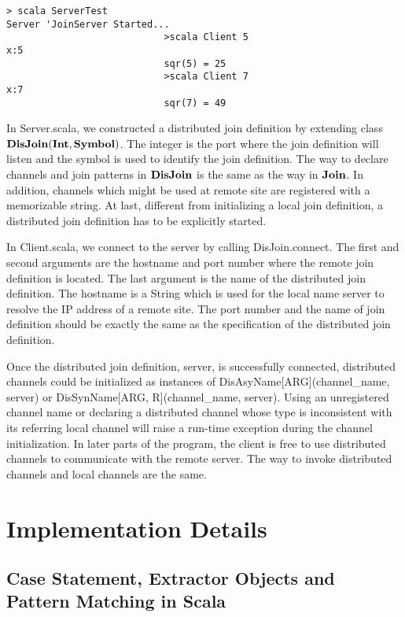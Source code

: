 \begin{lstlisting}
> scala ServerTest                                    
Server 'JoinServer Started...
							>scala Client 5
x:5
							sqr(5) = 25
							>scala Client 7
x:7
							sqr(7) = 49
\end{lstlisting}


In Server.scala, we constructed a distributed join definition by extending class \\ $\bf{DisJoin(Int, Symbol)}$.  The integer is the port where the join definition will listen and the symbol is used to identify the join definition.  The way to declare channels and join patterns in $\bf{DisJoin}$ is the same as the way in $\bf{Join}$.  In addition,  channels which might be used at remote site are registered with a memorizable string.  At last, different from initializing a local join definition, a distributed join definition has to be explicitly started.

In Client.scala, we connect to the server by calling DisJoin.connect.  The first and second arguments are the hostname and port number where the remote join definition is located.  The last argument is the name of the distributed join definition.  The hostname is a String which is used for the local name server to resolve the IP address of a remote site.  The port number and the name of join definition should be exactly the same as the specification of the distributed join definition.

Once the distributed join definition, server, is successfully connected, distributed channels could be initialized as instances of DisAsyName[ARG](channel\_name, server) or DisSynName[ARG, R](channel\_name, server).  Using an unregistered channel name or declaring a distributed channel whose type is inconsistent with  its referring local channel will raise a run-time exception during the channel initialization.  In later parts of the program, the client is free to use distributed channels to communicate with the remote server.  The way to invoke distributed channels and local channels are the same.

\section{Implementation Details}
\subsection{Case Statement, Extractor Objects and Pattern Matching in Scala}

